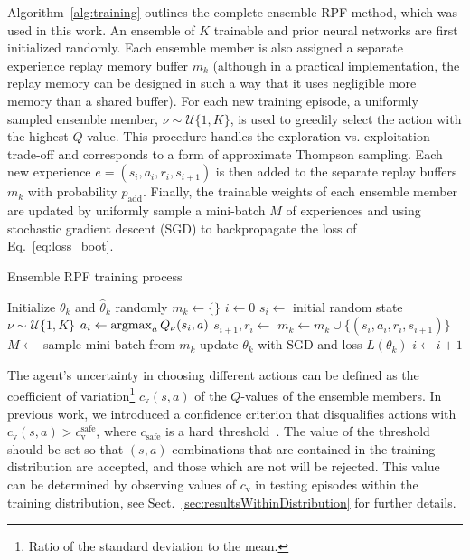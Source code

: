 Algorithm~\ref{alg:training} outlines the complete ensemble RPF method, which was used in this work. An ensemble of $K$ trainable and prior neural networks are first initialized randomly. Each ensemble member is also assigned a separate experience replay memory buffer $m_k$ (although in a practical implementation, the replay memory can be designed in such a way that it uses negligible more memory than a shared buffer). For each new training episode, a uniformly sampled ensemble member, $\nu \sim \mathcal{U}\{1,K\}$, is used to greedily select the action with the highest $Q$-value. This procedure handles the exploration vs. exploitation trade-off and corresponds to a form of approximate Thompson sampling. Each new experience $e = (s_i, a_i, r_i, s_{i+1})$ is then added to the separate replay buffers $m_k$ with probability $p_\mathrm{add}$. Finally, the trainable weights of each ensemble member are updated by uniformly sample a mini-batch $M$ of experiences and using stochastic gradient descent (SGD) to backpropagate the loss of Eq.~\ref{eq:loss_boot}.

\begin{algorithm}[!t]
	\caption{Ensemble RPF training process}\label{alg:training}
	\begin{algorithmic}[1]
			\State Initialize $\theta_k$ and $\hat{\theta}_k$ randomly
			\State $m_k \gets \{\}$
		\EndFor
		\State $i \gets 0$
			\State $s_i \gets $ initial random state
			\State $\nu \sim \mathcal{U}\{1,K\}$%
				\State $a_i \gets \operatorname*{argmax}_{a} Q_\nu(s_i,a)$
				\State $s_{i+1}, r_i \gets $ 
						\State $m_k \gets m_k \cup \{(s_i, a_i, r_i, s_{i+1})\}$
					\EndIf
					\State $M \gets $ sample mini-batch from $m_k$
					\State update $\theta_k$ with SGD and loss $L(\theta_k)$
				\EndFor
				\State $i \gets i + 1$
			\EndWhile
		\EndWhile
	\end{algorithmic}
\end{algorithm}



The agent's uncertainty in choosing different actions can be defined as the coefficient of variation\footnote{Ratio of the standard deviation to the mean.} $c_\mathrm{v}(s,a)$ of the $Q$-values of the ensemble members.  
In previous work, we introduced a confidence criterion that disqualifies actions with $c_\mathrm{v}(s,a) > c_\mathrm{v}^\mathrm{safe}$, where $c_\mathrm{safe}$ is a hard threshold~\cite{Hoel2020}. 
The value of the threshold should be set so that $(s,a)$ combinations that are contained in the training distribution are accepted, and those which are not will be rejected. This value can be determined by observing values of $c_\mathrm{v}$ in testing episodes within the training distribution, see Sect.~\ref{sec:resultsWithinDistribution} for further details. 


